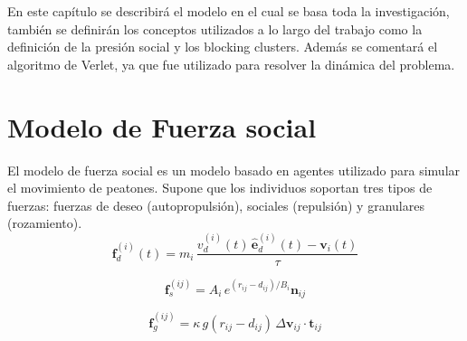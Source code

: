 En este capítulo se describirá el modelo en el cual se basa toda la investigación, también se definirán los conceptos utilizados a lo largo del trabajo como la definición de la presión social y los blocking clusters. Además se comentará el algoritmo de Verlet, ya que fue utilizado para resolver la dinámica del problema. 

\section{Modelo de Fuerza social}

El modelo de fuerza social es un modelo basado en agentes utilizado para simular el movimiento de peatones. Supone que los individuos soportan tres tipos de fuerzas: fuerzas de deseo (autopropulsión), sociales (repulsión) y granulares (rozamiento).  \\

\begin{equation}
\mathbf{f}_d^ {(i)}(t)=m_i\,\displaystyle\frac{v_d^ {(i)}(t)\,\hat{\mathbf{e}}_d^ {(i)}(t)-\mathbf{v}_i(t)}{\tau}\label{eqn_1review}
\end{equation}

\begin{equation}
\mathbf{f}_s^{(ij)}=A_i\,e^{(r_{ij}-d_{ij})/B_i}\mathbf{n}_{ij}\label{eqn_1}
\end{equation} 

\begin{equation}
\mathbf{f}_g^{(ij)}=\kappa\,g(r_{ij}-d_{ij})\,\Delta \mathbf{v}_{ij}\cdot\mathbf{t}_{ij}
\end{equation}
